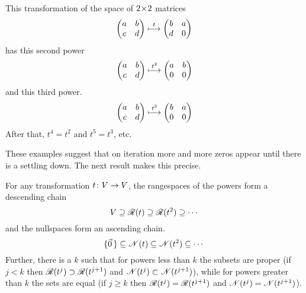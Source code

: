 \begin{example}
This transformation of the space of $2 \! \times \! 2$ matrices
\begin{equation*}
  \begin{pmatrix}
    a  &b  \\
    c  &d
  \end{pmatrix}
  \stackrel{t}{\longmapsto}
  \begin{pmatrix}
    b  &a  \\
    d  &0
  \end{pmatrix}
\end{equation*}
has this second power
\begin{equation*}
  \begin{pmatrix}
    a  &b  \\
    c  &d
  \end{pmatrix}
  \stackrel{t^2}{\longmapsto}
  \begin{pmatrix}
    a  &b  \\
    0  &0
  \end{pmatrix}
\end{equation*}
and this third power.
\begin{equation*}
  \begin{pmatrix}
    a  &b  \\
    c  &d
  \end{pmatrix}
  \stackrel{t^3}{\longmapsto}
  \begin{pmatrix}
    b  &a  \\
    0  &0
  \end{pmatrix}
\end{equation*}
After that, $t^4=t^2$ and $t^5=t^3$, etc.
\end{example}

These examples suggest that on iteration more and more zeros appear
until there is a settling down.
The next result makes this precise.

\begin{lemma}  \label{le:RangeAndNullChains}
For any transformation \( \mbox{$t\colon V\to V$} \), the rangespaces of the powers
form a descending chain
\begin{equation*}
  V\supseteq \mathscr{R}(t)\supseteq\mathscr{R}(t^2)\supseteq\cdots
\end{equation*}
and the nullspaces form an ascending chain.
\begin{equation*}
  \mbox{$\{\vec{0}\,\}$}\subseteq\mathscr{N}(t)\subseteq\mathscr{N}(t^2)\subseteq\cdots
\end{equation*}
Further, there is a \( k \) such that
for powers less than $k$ the subsets are proper
(if $j<k$ then $\mathscr{R}(t^j)\supset\mathscr{R}(t^{j+1})$
and 
$\mathscr{N}(t^j)\subset\mathscr{N}(t^{j+1})$), 
while for powers greater than $k$ the sets are equal
(if $j\geq k$ then $\mathscr{R}(t^j)=\mathscr{R}(t^{j+1})$
and 
$\mathscr{N}(t^j)=\mathscr{N}(t^{j+1})$).  
\end{lemma}


